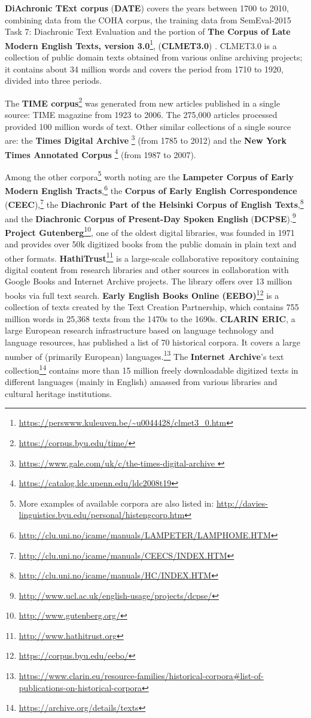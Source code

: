 \documentclass[output=paper]{langsci/langscibook}
\begin{document}
\textbf{DiAchronic TExt corpus} (\textbf{DATE}) covers the years between 1700 to 2010, combining data from the COHA corpus, the training data from SemEval-2015 Task 7: Diachronic Text Evaluation \citep{popescu2015semeval} and the portion of \textbf{The Corpus of Late Modern English Texts, version 3.0}\footnote{\url{https://perswww.kuleuven.be/~u0044428/clmet3_0.htm}}, (\textbf{CLMET3.0}) \citep{diller2011european}. 
CLMET3.0 is a collection of public domain texts obtained from various online archiving projects; it contains about 34 million words and covers the period from 1710 to 1920, divided into three periods.

The \textbf{TIME corpus}\footnote{\url{https://corpus.byu.edu/time/}} was generated from new articles published in a single source: TIME magazine from 1923 to 2006.
The 275,000 articles processed provided 100 million words of text. Other similar collections of a single source are: the \textbf{Times Digital Archive} \footnote{\url{https://www.gale.com/uk/c/the-times-digital-archive
}} (from 1785 to 2012) and the \textbf{New York Times Annotated Corpus} \footnote{\url{https://catalog.ldc.upenn.edu/ldc2008t19}} (from 1987 to 2007). 

Among the other corpora\footnote{More examples of available corpora are also listed in: \url{http://davies-linguistics.byu.edu/personal/histengcorp.htm}} worth noting are the \textbf{Lampeter Corpus of Early Modern English Tracts},\footnote{\url{http://clu.uni.no/icame/manuals/LAMPETER/LAMPHOME.HTM}} the \textbf{Corpus of Early English Correspondence} (\textbf{CEEC}),\footnote{\url{http://clu.uni.no/icame/manuals/CEECS/INDEX.HTM}} the \textbf{Diachronic Part of the Helsinki Corpus of English Texts},\footnote{\url{http://clu.uni.no/icame/manuals/HC/INDEX.HTM}} and the \textbf{Diachronic Corpus of Present-Day Spoken English} (\textbf{DCPSE}).\footnote{\url{http://www.ucl.ac.uk/english-usage/projects/dcpse/}}
\textbf{Project Gutenberg}\footnote{\url{http://www.gutenberg.org/}}, one of the oldest digital libraries, was founded in 1971 and provides over 50k digitized books from the public domain in plain text and other formats. 
 \textbf{HathiTrust}\footnote{\url{http://www.hathitrust.org}} is a large-scale collaborative repository containing digital content from research libraries and other sources in collaboration with Google Books and Internet Archive projects. The library offers over 13 million books via full text search. \textbf{Early English Books Online (EEBO)}\footnote{\url{https://corpus.byu.edu/eebo/}} is a collection of texts created by the Text Creation Partnership, which contains 755 million words in 25,368 texts from the 1470s to the 1690s. \textbf{CLARIN ERIC}, a large European research infrastructure based on language technology and language resources, has published a list of 70 historical corpora. It covers a large number of (primarily European) languages.\footnote{\url{https://www.clarin.eu/resource-families/historical-corpora\#list-of-publications-on-historical-corpora}}
The \textbf{Internet Archive}'s text collection\footnote{\url{https://archive.org/details/texts}} contains more than 15 million freely downloadable digitized texts in different languages (mainly in English) amassed from various libraries and cultural heritage institutions. 
\end{document}
